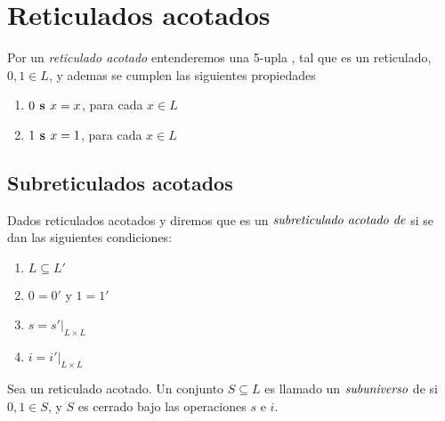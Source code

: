 
\section{Reticulados acotados}
  \begin{definition}
    Por un \emph{reticulado acotado} entenderemos una 5-upla \reticulAcot, tal que \reticulAlg
    es un reticulado, $0, 1 \in L$, y ademas se cumplen las siguientes propiedades
    \begin{enumerate}
      \item $0\textbf{ s }x = x$, para cada $x \in L$
      \item $1\textbf{ s }x = 1$, para cada $x \in L$
    \end{enumerate}
  \end{definition}

  \subsection{Subreticulados acotados}
  \begin{definition}
    Dados reticulados acotados \reticulAcot y  diremos que \reticulAcot
    es un $\emph{subreticulado acotado de}$  si se dan las siguientes condiciones:
    \begin{enumerate}
      \item $L \subseteq L'$
      \item $0 = 0'$ y $1 = 1'$
      \item $s = s'\vert_{L \times L}$
      \item $i = i'\vert_{L \times L}$
    \end{enumerate}

    Sea \reticulAcot un reticulado acotado. Un conjunto $S \subseteq L$ es llamado un $\emph{subuniverso}$ de
    \reticulAcot si $0, 1 \in S$, y $S$ es cerrado bajo las operaciones $s$ e $i$.
  \end{definition}

